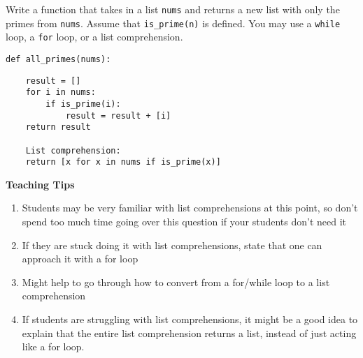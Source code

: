 \begin{blocksection}
\question Write a function that takes in a list \lstinline{nums} and returns a
new list with only the primes from \lstinline{nums}. Assume that
\lstinline{is_prime(n)} is defined. You may use a \lstinline{while} loop, a
\lstinline{for} loop, or a list comprehension.


\begin{lstlisting}
def all_primes(nums):
\end{lstlisting}

\begin{solution}[2in]
\begin{lstlisting}
    result = []
    for i in nums:
        if is_prime(i):
            result = result + [i]
    return result

    List comprehension:
    return [x for x in nums if is_prime(x)]
\end{lstlisting}
\end{solution}
\end{blocksection}

\begin{blocksection}
    \begin{guide}
    \textbf{Teaching Tips}
    \begin{enumerate}
            \item Students may be very familiar with list comprehensions at this point, so don’t spend too much time going over this question if your students don’t need it
            \item If they are stuck doing it with list comprehensions, state that one can approach it with a for loop
            \item Might help to go through how to convert from a for/while loop to a list comprehension
            \item If students are struggling with list comprehensions, it might be a good idea to explain that the entire list comprehension returns a list, instead of just acting like a for loop.
    \end{enumerate}
    \end{guide}
\end{blocksection}